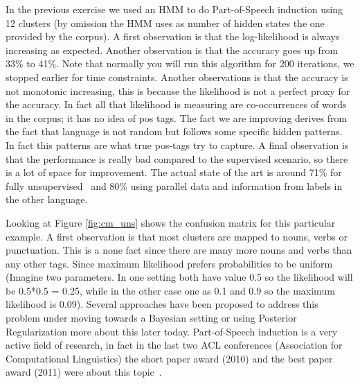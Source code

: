 In the previous exercise we used an HMM to do Part-of-Speech induction using 12 clusters (by omission the HMM uses as number of hidden states the one provided by the corpus). A first observation is that the log-likelihood is always increasing as expected. Another observation is that the accuracy goes up from 33\% to 41\%. Note that normally you will run this algorithm for 200 iterations, we stopped earlier for time constraints. Another observations is that the accuracy is not monotonic increasing, this is because the likelihood is not a perfect proxy for the accuracy. In fact all that likelihood is measuring are co-occurrences of words in the corpus; it has no idea of pos tags. The fact we are improving derives from the fact that language is not random but follows some specific hidden patterns. In fact this patterns are what true pos-tags try to capture. A final observation is that the performance is really bad compared to the supervised scenario, so there is a lot of space for improvement. The actual state of the art is around 71\% for fully unsupervised~\citep{JoaoThesis,bergkirkpatrick2010naacl} and 80\% \citep{das-petrov:2011:ACL-HLT2011} using parallel data and information from labels in the other language. 

Looking at Figure \ref{fig:cm_uns} shows the confusion matrix for this particular example. 
A first observation is that most clusters are mapped to nouns, verbs or punctuation. 
This is a none fact since there are many more nouns and verbs than any other tags. Since maximum likelihood prefers probabilities 
to be uniform (Imagine two parameters. In one setting both have value 0.5 so the likelihood will be 0.5*0.5 = 0.25, 
while in the other case one as 0.1 and 0.9 so the maximum likelihood is 0.09). Several approaches have been proposed to 
address this problem under moving towards a Bayesian setting or using 
Posterior Regularization \citep{johnson2007dtf,graca2009nips} more about this later today. 
Part-of-Speech induction is a very active field of research, in fact in the last two ACL conferences (Association for Computational Linguistics) the short paper award (2010) and the best paper award (2011) were about this topic~\citep{lamar-EtAl:2010:Short,das-petrov:2011:ACL-HLT2011}.




